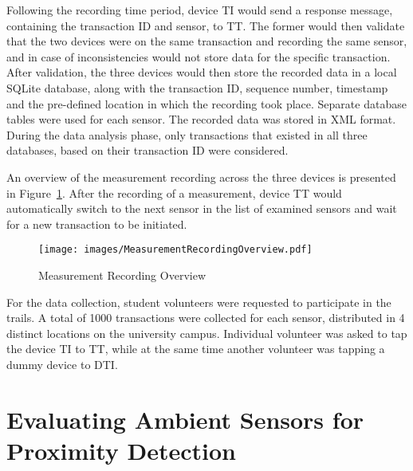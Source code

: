 \documentclass[runningheads,a4paper]{llncs}
\begin{document}
Following the recording time period, device TI would send a response message, containing the transaction ID and sensor, to TT\@.
The former would then validate that the two devices were on the same transaction and recording the same sensor, and in case of inconsistencies would not store data for the specific transaction.
After validation, the three devices would then store the recorded data in a local SQLite database, along with the transaction ID, sequence number, timestamp and the pre-defined location in which the recording took place.
Separate database tables were used for each sensor.
The recorded data was stored in XML format.
During the data analysis phase, only transactions that existed in all three databases, based on their transaction ID were considered.

An overview of the measurement recording across the three devices is presented in Figure~\ref{fig:diagram}.
After the recording of a measurement, device TT would automatically switch to the next sensor in the list of examined sensors and wait for a new transaction to be initiated.



\begin{figure}
	\centering
	\texttt{[image: images/MeasurementRecordingOverview.pdf]}
	\caption{Measurement Recording Overview}
	\label{fig:diagram}
\end{figure}






For the data collection, student volunteers were requested to participate in the trails. 
A total of 1000 transactions were collected for each sensor, distributed in 4 distinct locations on the university campus.
Individual volunteer was asked to tap the device TI to TT, while at the same time another volunteer was tapping a dummy device to DTI. 
\section{Evaluating Ambient Sensors for Proximity Detection}
\end{document}
